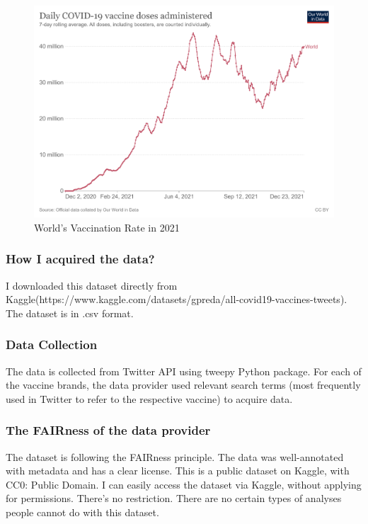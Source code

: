 \documentclass{article}
\begin{document}
\begin{figure}[H]
\centering
\includegraphics[width=15cm]{coronavirus-data-explorer.png}
\caption{World's Vaccination Rate in 2021}
\end{figure}

\subsubsection{How I acquired the data?}
I downloaded this dataset directly from Kaggle(https://www.kaggle.com/datasets/gpreda/all-covid19-vaccines-tweets). The dataset is in .csv format.

\subsubsection{Data Collection}
The data is collected from Twitter API using tweepy Python package. For each of the vaccine brands, the data provider used relevant search terms (most frequently used in Twitter to refer to the respective vaccine) to acquire data.

\subsubsection{The FAIRness of the data provider}
The dataset is following the FAIRness principle. The data was well-annotated with metadata and has a clear license. This is a public dataset on Kaggle, with CC0: Public Domain. I can easily access the dataset via Kaggle, without applying for permissions. There's no restriction. There are no certain types of analyses people cannot do with this dataset.
\end{document}
